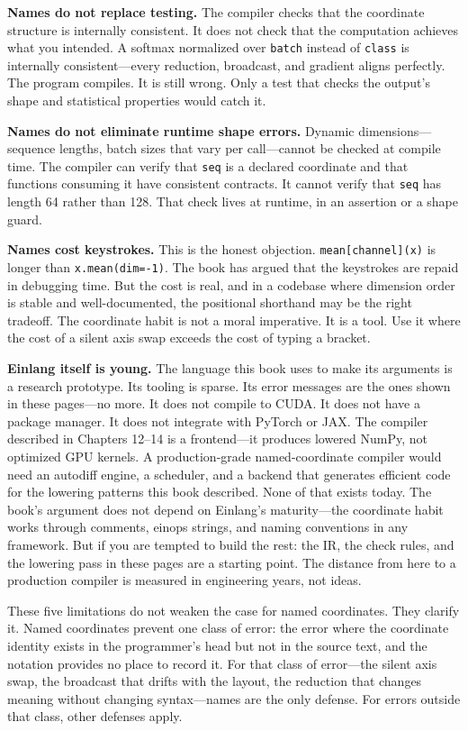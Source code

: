 \documentclass[11pt,titlepage]{article}
\begin{document}
\textbf{Names do not replace testing.} The compiler checks that the
coordinate structure is internally consistent. It does not check that
the computation achieves what you intended. A softmax normalized over
\texttt{batch} instead of \texttt{class} is internally
consistent---every reduction, broadcast, and gradient aligns perfectly.
The program compiles. It is still wrong. Only a test that checks the
output's shape and statistical properties would catch it.

\textbf{Names do not eliminate runtime shape errors.} Dynamic
dimensions---sequence lengths, batch sizes that vary per call---cannot
be checked at compile time. The compiler can verify that \texttt{seq} is
a declared coordinate and that functions consuming it have consistent
contracts. It cannot verify that \texttt{seq} has length 64 rather than
128. That check lives at runtime, in an assertion or a shape guard.

\textbf{Names cost keystrokes.} This is the honest objection.
\texttt{mean{[}channel{]}(x)} is longer than \texttt{x.mean(dim=-1)}.
The book has argued that the keystrokes are repaid in debugging time.
But the cost is real, and in a codebase where dimension order is stable
and well-documented, the positional shorthand may be the right tradeoff.
The coordinate habit is not a moral imperative. It is a tool. Use it
where the cost of a silent axis swap exceeds the cost of typing a
bracket.

\textbf{Einlang itself is young.} The language this book uses to make
its arguments is a research prototype. Its tooling is sparse. Its error
messages are the ones shown in these pages---no more. It does not
compile to CUDA. It does not have a package manager. It does not
integrate with PyTorch or JAX. The compiler described in Chapters 12--14
is a frontend---it produces lowered NumPy, not optimized GPU kernels. A
production-grade named-coordinate compiler would need an autodiff
engine, a scheduler, and a backend that generates efficient code for the
lowering patterns this book described. None of that exists today. The
book's argument does not depend on Einlang's maturity---the coordinate
habit works through comments, einops strings, and naming conventions in
any framework. But if you are tempted to build the rest: the IR, the
check rules, and the lowering pass in these pages are a starting point.
The distance from here to a production compiler is measured in
engineering years, not ideas.

These five limitations do not weaken the case for named coordinates.
They clarify it. Named coordinates prevent one class of error: the error
where the coordinate identity exists in the programmer's head but not in
the source text, and the notation provides no place to record it. For
that class of error---the silent axis swap, the broadcast that drifts
with the layout, the reduction that changes meaning without changing
syntax---names are the only defense. For errors outside that class,
other defenses apply.
\end{document}

